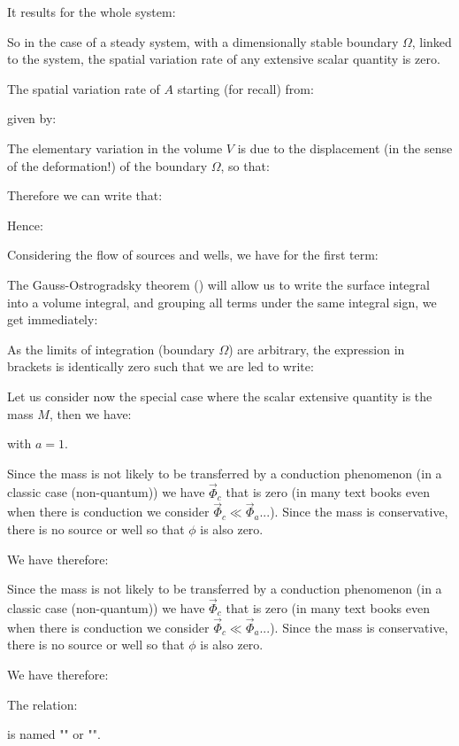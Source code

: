 	It results for the whole system:
	
	So in the case of a steady system, with a dimensionally stable boundary $\Omega$, linked to the system, the spatial variation rate  of any extensive scalar quantity is zero.
	
	The spatial variation rate of $A$ starting (for recall) from:
	
	given by:
	
	The elementary variation in the volume $V$ is due to the displacement (in the sense of the deformation!) of the boundary $\Omega$, so that:
	
	Therefore we can write that:
	
	Hence:
	
	Considering the flow of sources and wells, we have for the first term:
	
	The Gauss-Ostrogradsky theorem () will allow us to write the surface integral into a volume integral, and grouping all terms under the same integral sign, we get immediately:
	
	As the limits of integration (boundary $\Omega$) are arbitrary, the expression in brackets is identically zero such that we are led to write:
	
	Let us consider now the special case where the scalar extensive quantity is the mass $M$, then we have:
	
	with $a=1$.
	
	Since the mass is not likely to be transferred by a conduction phenomenon (in a classic case (non-quantum)) we have $\vec{\Phi}_c$ that is zero (in many text books even when there is conduction we consider $\vec{\Phi}_c\ll \vec{\Phi}_a $...). Since the mass is conservative, there is no source or well so that $\phi$ is also zero.

	We have therefore:
	
	Since the mass is not likely to be transferred by a conduction phenomenon (in a classic case (non-quantum)) we have $\vec{\Phi}_c$ that is zero (in many text books even when there is conduction we consider $\vec{\Phi}_c\ll \vec{\Phi}_a $...). Since the mass is conservative, there is no source or well so that $\phi$ is also zero.

	We have therefore:
	
	The relation:
	
	is named "" or "".

